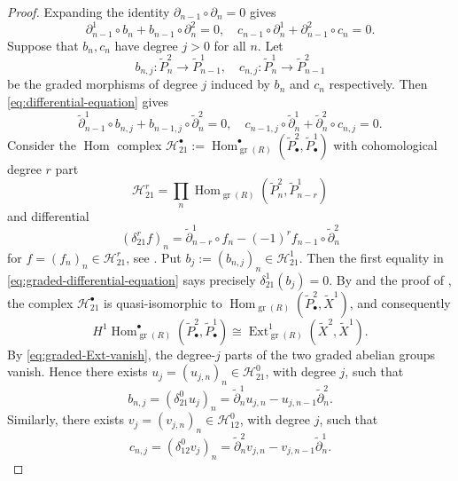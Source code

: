 \documentclass[11pt,a4paper]{article} %
\def\cH{\mathcal{H}}
\def\Ext{\operatorname{Ext}} %
\def\gr{\operatorname{gr}}
\def\Hom{\operatorname{Hom}}
\begin{document}
\begin{proof}
Expanding the identity $\partial_{n-1}\circ\partial_n=0$ gives
\begin{equation}\label{eq:differential-equation}
    \partial^1_{n-1}\circ b_n+b_{n-1}\circ\partial^2_n=0,\quad c_{n-1}\circ\partial^1_n+\partial^2_{n-1}\circ c_n=0.
\end{equation}
Suppose that $b_n,c_n$ have degree $j>0$ for all $n$. Let
\[
b_{n,j}:\widetilde{P}^2_n\longrightarrow\widetilde{P}^1_{n-1},\quad c_{n,j}:\widetilde{P}^1_n\longrightarrow\widetilde{P}^2_{n-1}
\]
be the graded morphisms of degree $j$ induced by $b_n$ and $c_n$ respectively. Then \eqref{eq:differential-equation} gives
\begin{equation}\label{eq:graded-differential-equation}
    \widetilde{\partial}^1_{n-1}\circ b_{n,j}+b_{n-1,j}\circ\widetilde{\partial}^2_n=0,\quad c_{n-1,j}\circ\widetilde{\partial}^1_n+\widetilde{\partial}^2_n\circ c_{n,j}=0.
\end{equation}
Consider the $\Hom$ complex $\cH_{21}^\bullet:=\Hom_{\gr(R)}^\bullet(\widetilde{P}^2_\bullet,\widetilde{P}^1_\bullet)$ with cohomological degree $r$ part 
\[
\cH_{21}^r=\prod_n\Hom_{\gr(R)}(\widetilde{P}^2_n,\widetilde{P}^1_{n-r})
\]
and differential 
\[
(\delta_{21}^r f)_n=\widetilde{\partial}^1_{n-r}\circ f_n-(-1)^r f_{n-1}\circ\widetilde{\partial}^2_n
\]
for $f=(f_n)_n\in \cH_{21}^r$, see \cite[\S2.7.4, 2.7.5]{WC}. Put $b_j:=(b_{n,j})_n\in\cH_{21}^1$. Then the first equality in \eqref{eq:graded-differential-equation} says precisely $\delta_{21}^1(b_j)=0$. By \cite[Lemma 2.7.3]{WC} and the proof of \cite[Theorem 2.7.2]{WC}, the complex $\cH_{21}^\bullet$ is quasi-isomorphic to $\Hom_{\gr(R)}(\widetilde{P}^2_\bullet,\widetilde{X}^1)$, and consequently
\[
    H^1
    \Hom_{\gr(R)}^\bullet(\widetilde{P}^2_\bullet,\widetilde{P}^1_\bullet)
    \cong
    \Ext^1_{\gr(R)}(\widetilde{X}^2,\widetilde{X}^1).
\]
By \eqref{eq:graded-Ext-vanish}, the degree-$j$ parts of the two graded abelian groups vanish. Hence there exists $u_j=(u_{j,n})_n\in \cH_{21}^0$, with degree $j$, such that
\[
    b_{n,j}=(\delta_{21}^0 u_j)_n
    =
    \widetilde{\partial}^1_n u_{j,n}
    -
    u_{j,n-1}\widetilde{\partial}^2_n.
\]
Similarly, there exists $v_j=(v_{j,n})_n\in \cH_{12}^0$, with degree $j$, such that
\[
    c_{n,j}=(\delta_{12}^0 v_j)_n
    =
    \widetilde{\partial}^2_n v_{j,n}
    -
    v_{j,n-1}\widetilde{\partial}^1_n.
\]


\end{proof}
\end{document}

